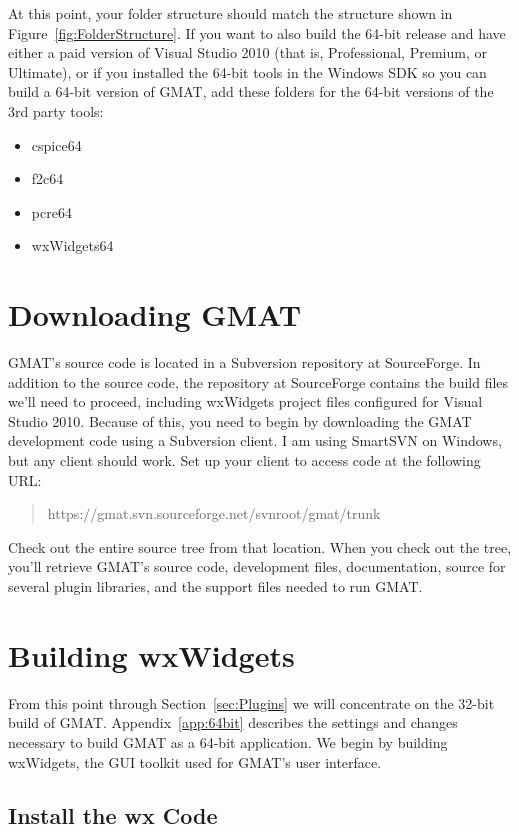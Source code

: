 \documentclass[letterpaper,10pt]{article}%
\begin{document}
\noindent At this point, your folder structure should match the structure shown in Figure~\ref{fig:FolderStructure}.  If you want to also build the 64-bit release and have either a paid version of Visual Studio 2010 (that is, Professional, Premium, or Ultimate), or if you installed the 64-bit tools in the Windows SDK so you can build a 64-bit version of GMAT, add these folders for the 64-bit versions of the 3rd party tools:
\begin{itemize}
\item cspice64
\item f2c64
\item pcre64
\item wxWidgets64
\end{itemize}

\section{Downloading GMAT}

GMAT's source code is located in a Subversion repository at SourceForge.  In addition to the source code, the repository at SourceForge contains the build files we'll need to proceed, including wxWidgets project files configured for Visual Studio 2010.  Because of this, you need to begin by downloading the GMAT development code using a Subversion client.  I am using SmartSVN on Windows, but any client should work.  Set up your client to access code at the following URL:

\begin{quote}
https://gmat.svn.sourceforge.net/svnroot/gmat/trunk
\end{quote}
\noindent Check out the entire source tree from that location.  When you check out the tree, you'll retrieve GMAT's source code, development files, documentation, source for several plugin libraries, and the support files needed to run GMAT.

\section{Building wxWidgets}

From this point through Section~\ref{sec:Plugins} we will concentrate on the 32-bit build of GMAT.  Appendix~\ref{app:64bit} describes the settings and changes necessary to build GMAT as a 64-bit application.  We begin by building wxWidgets, the GUI toolkit used for GMAT's user interface.

\subsection{Install the wx Code}
\end{document}
